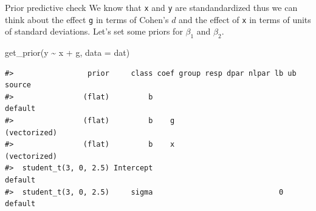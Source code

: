 \documentclass[
  ignorenonframetext,
]{beamer}
\newenvironment{Shaded}{\begin{snugshade}}{\end{snugshade}}
\newcommand{\AttributeTok}[1]{\textcolor[rgb]{0.40,0.45,0.13}{#1}}
\newcommand{\FunctionTok}[1]{\textcolor[rgb]{0.28,0.35,0.67}{#1}}
\newcommand{\NormalTok}[1]{\textcolor[rgb]{0.00,0.23,0.31}{#1}}
\newcommand{\SpecialCharTok}[1]{\textcolor[rgb]{0.37,0.37,0.37}{#1}}
\begin{document}
\begin{frame}[fragile]{Prior predictive check}
\label{prior-predictive-check-2}
We know that \texttt{x} and \texttt{y} are standandardized thus we can
think about the effect \texttt{g} in terms of Cohen's \(d\) and the
effect of \texttt{x} in terms of units of standard deviations. Let's set
some priors for \(\beta_1\) and \(\beta_2\).

\begin{Shaded}
\begin{Highlighting}[]
\FunctionTok{get\_prior}\NormalTok{(y }\SpecialCharTok{\textasciitilde{}}\NormalTok{ x }\SpecialCharTok{+}\NormalTok{ g, }\AttributeTok{data =}\NormalTok{ dat)}
\end{Highlighting}
\end{Shaded}

\begin{verbatim}
#>                 prior     class coef group resp dpar nlpar lb ub       source
#>                (flat)         b                                       default
#>                (flat)         b    g                             (vectorized)
#>                (flat)         b    x                             (vectorized)
#>  student_t(3, 0, 2.5) Intercept                                       default
#>  student_t(3, 0, 2.5)     sigma                             0         default
\end{verbatim}
\end{frame}
\end{document}
